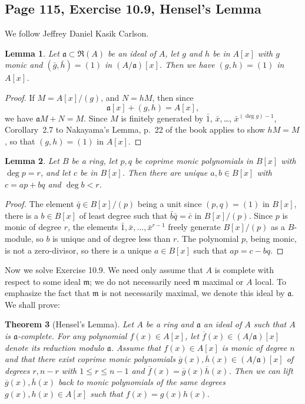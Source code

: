 \documentclass[parskip=half,fontsize=12pt]{scrartcl}%
\newcommand{\mf}{\mathfrak}
\newcommand{\aaa}{\mf a}
\newcommand{\mmm}{\mf m}
\newtheorem{thm}{Theorem}%
\newtheorem{lem}[thm]{Lemma}
\begin{document}
\subsection{Page 115, Exercise 10.9, Hensel's Lemma}%

We follow Jeffrey Daniel Kasik Carlson. 

\begin{lem}\label{L106b}
Let $\aaa\subset\mf R(A)$ be an ideal of $A$, let $g$ and $h$ be in $A[x]$ with $g$ monic and $(\bar g,\bar h)=(1)$ in $(A/\aaa)[x]$. Then we have $(g,h)=(1)$ in $A[x]$. 
\end{lem} 
\begin{proof} 
If $M=A[x]/(g)$, and $N=hM$, then since 
$$
\aaa[x]+(g, h)=A[x],
$$ 
we have $\aaa M+N=M$. Since $M$ is finitely generated by $\bar 1$, $\bar x, $\dots, $\bar x^{(\deg g)-1}$, Corollary~2.7 to Nakayama’s Lemma, p.~22 of the book applies to show $hM=M$, so that $(g,h)=(1)$ in $A[x]$. 
\end{proof}

\begin{lem}\label{L106a}
Let $B$ be a ring, let $p,q$ be coprime monic polynomials in $B[x]$ with $\deg p=r$, and let $c$ be in $B[x]$. Then there are unique $a,b\in B[x]$ with $c=ap+bq$ and $\deg b<r$. 
\end{lem} 
\begin{proof}
The element $\bar q\in B[x]/(p)$ being a unit since $(p,q)=(1)$ in $B[x]$, there is a $b\in B[x]$ of least degree such that $\bar b\bar q=\bar c$ in $B[x]/(p)$. Since $p$ is monic of degree $r$, the elements $\bar 1,\bar x,\dots,\bar x^{r-1}$ freely generate $B[x]/(p)$ as a $B$-module, so $b$ is unique and of degree less than $r$. The polynomial $p$, being monic, is not a zero-divisor, so there is a unique $a\in B[x]$ such that $ap=c-bq$.
\end{proof}

Now we solve Exercise 10.9. We need only assume that $A$ is complete with respect to some ideal $\mmm$; we do not necessarily need $\mmm$ maximal or $A$ local. To emphasize the fact that $\mmm$ is not necessarily maximal, we denote this ideal by $\aaa$. We shall prove:

\begin{thm}[Hensel's Lemma]\label{hl}
Let $A$ be a ring and $\aaa$ an ideal of $A$ such that $A$ is $\aaa$-complete. For any polynomial $f(x)\in A[x]$, let $\overline f(x)\in(A/\aaa)[x]$ denote its reduction modulo $\aaa$. Assume that $f(x)\in A[x]$ is monic of degree $n$ and that there exist coprime monic polynomials $\overline g(x),\overline h(x)\in(A/\aaa)[x]$ of degrees $r,n-r$ with $1\le r\le n-1$ and $\overline f(x)=\overline g(x)\overline h(x)$. Then we can lift $\overline g(x),\overline h(x)$ back to monic polynomials of the same degrees $g(x),h(x)\in A[x]$ such that $f(x)=g(x)h(x)$.
\end{thm}
\end{document}
